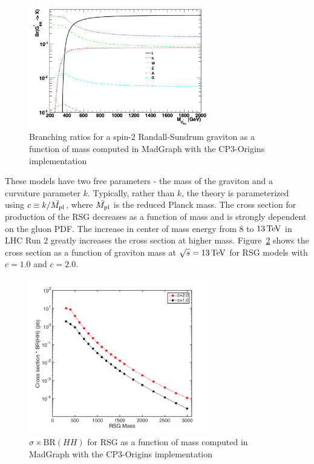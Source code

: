 \begin{figure}[h!]
  \centering
  \captionsetup{justification=centering}

  \includegraphics[width=0.7\textwidth]{figures/G_BR}
   \caption{Branching ratios for a spin-2 Randall-Sundrum graviton as a function of mass computed in MadGraph with the CP3-Origins implementation~\cite{RSG_LHC,MadGraph}}
  \label{fig:G_BR}
\end{figure}

These models have two free parameters - the mass of the graviton and a curvature parameter $k$. Typically, rather than $k$, the theory is parameterized using $c \equiv k/\bar{M_{\rm pl}}$, where $\bar{M_{\rm pl}}$ is the reduced Planck mass. The cross section for production of the RSG decreases as a function of mass and is strongly dependent on the gluon PDF. The increase in center of mass energy from $8$ to $13 \TeV$ in LHC Run 2 greatly increases the cross section at higher mass. Figure~\ref{fig:G_xsec} shows the cross section as a function of graviton mass at $\sqrt{s} = 13 \TeV$ for RSG models with $c=1.0$ and $c=2.0$. 

\begin{figure}[h!]
  \centering
  \captionsetup{justification=centering}

  \includegraphics[width=0.7\textwidth]{figures/RSG_xsec}
   \caption{$\sigma \times \textrm{BR}(HH)$ for RSG as a function of mass computed in MadGraph with the CP3-Origins implementation~\cite{RSG_LHC,MadGraph}}
  \label{fig:G_xsec}
\end{figure}

